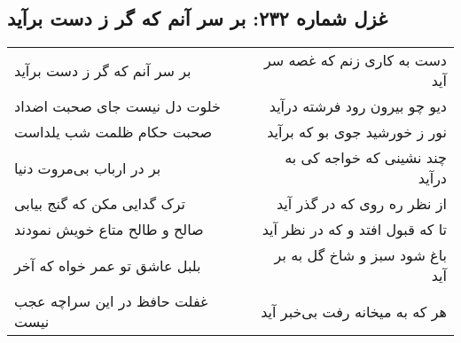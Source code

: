 \begin{center}
\section*{غزل شماره ۲۳۲: بر سر آنم که گر ز دست برآید}
\label{sec:sh232}
\begin{longtable}{l p{0.5cm} r}
بر سر آنم که گر ز دست برآید
&&
دست به کاری زنم که غصه سر آید
\\
خلوت دل نیست جای صحبت اضداد
&&
دیو چو بیرون رود فرشته درآید
\\
صحبت حکام ظلمت شب یلداست
&&
نور ز خورشید جوی بو که برآید
\\
بر در ارباب بی‌مروت دنیا
&&
چند نشینی که خواجه کی به درآید
\\
ترک گدایی مکن که گنج بیابی
&&
از نظر ره روی که در گذر آید
\\
صالح و طالح متاع خویش نمودند
&&
تا که قبول افتد و که در نظر آید
\\
بلبل عاشق تو عمر خواه که آخر
&&
باغ شود سبز و شاخ گل به بر آید
\\
غفلت حافظ در این سراچه عجب نیست
&&
هر که به میخانه رفت بی‌خبر آید
\\
\end{longtable}
\end{center}
